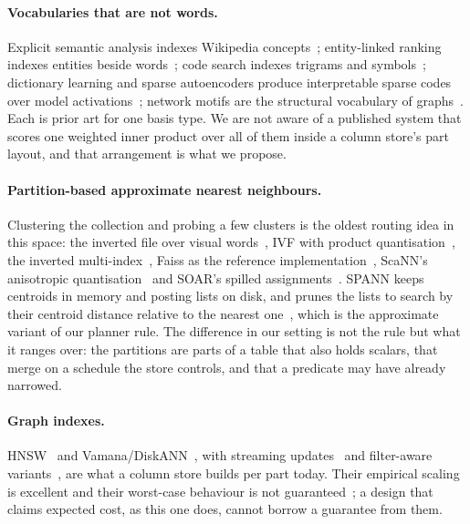 \paragraph{Vocabularies that are not words.}
Explicit semantic analysis indexes Wikipedia concepts~\cite{gabrilovich2007esa};
entity-linked ranking indexes entities beside
words~\cite{dalton2014entity,xiong2017duet}; code search indexes trigrams and
symbols~\cite{cox2012trigram}; dictionary learning and sparse autoencoders
produce interpretable sparse codes over model
activations~\cite{olshausen1996sparse,cunningham2023sae}; network motifs are
the structural vocabulary of graphs~\cite{milo2002motifs}. Each is prior art
for one basis type. We are not aware of a published system that scores one
weighted inner product over all of them inside a column store's part layout,
and that arrangement is what we propose.

\paragraph{Partition-based approximate nearest neighbours.}
Clustering the collection and probing a few clusters is the oldest routing idea
in this space: the inverted file over visual words~\cite{sivic2003videogoogle},
IVF with product quantisation~\cite{jegou2011pq}, the inverted
multi-index~\cite{babenko2012imi}, Faiss as the reference
implementation~\cite{johnson2021faiss}, ScaNN's anisotropic
quantisation~\cite{guo2020scann} and SOAR's spilled
assignments~\cite{sun2023soar}. SPANN keeps centroids in memory and posting
lists on disk, and prunes the lists to search by their centroid distance
relative to the nearest one~\cite{chen2021spann}, which is the approximate
variant of our planner rule. The difference in our setting is not the rule but
what it ranges over: the partitions are parts of a table that also holds
scalars, that merge on a schedule the store controls, and that a predicate may
have already narrowed.

\paragraph{Graph indexes.}
HNSW~\cite{malkov2020hnsw} and Vamana/DiskANN~\cite{subramanya2019diskann},
with streaming updates~\cite{singh2021freshdiskann} and filter-aware
variants~\cite{gollapudi2023filtered,patel2024acorn}, are what a column store
builds per part today. Their empirical scaling is excellent and their
worst-case behaviour is not
guaranteed~\cite{prokhorenkova2020graph,indyk2023worst}; a design that claims
expected cost, as this one does, cannot borrow a guarantee from them.


